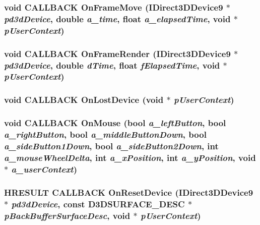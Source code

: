 \subsubsection[{OnFrameMove}]{\setlength{\rightskip}{0pt plus 5cm}void CALLBACK OnFrameMove (IDirect3DDevice9 $\ast$ {\em pd3dDevice}, \/  double {\em a\_\-time}, \/  float {\em a\_\-elapsedTime}, \/  void $\ast$ {\em pUserContext})}\label{main_8cpp_acfab206dcd4d453c6eb12c42b61a1e0d}
\subsubsection[{OnFrameRender}]{\setlength{\rightskip}{0pt plus 5cm}void CALLBACK OnFrameRender (IDirect3DDevice9 $\ast$ {\em pd3dDevice}, \/  double {\em dTime}, \/  float {\em fElapsedTime}, \/  void $\ast$ {\em pUserContext})}\label{main_8cpp_a4ea70c24b78c4abd92b442516fa054c3}
\subsubsection[{OnLostDevice}]{\setlength{\rightskip}{0pt plus 5cm}void CALLBACK OnLostDevice (void $\ast$ {\em pUserContext})}\label{main_8cpp_a8619e65167cef016a9b827796d09bd06}
\subsubsection[{OnMouse}]{\setlength{\rightskip}{0pt plus 5cm}void CALLBACK OnMouse (bool {\em a\_\-leftButton}, \/  bool {\em a\_\-rightButton}, \/  bool {\em a\_\-middleButtonDown}, \/  bool {\em a\_\-sideButton1Down}, \/  bool {\em a\_\-sideButton2Down}, \/  int {\em a\_\-mouseWheelDelta}, \/  int {\em a\_\-xPosition}, \/  int {\em a\_\-yPosition}, \/  void $\ast$ {\em a\_\-userContext})}\label{main_8cpp_a3ce2ae82f91e623da2ea0106afbf19d3}
\subsubsection[{OnResetDevice}]{\setlength{\rightskip}{0pt plus 5cm}HRESULT CALLBACK OnResetDevice (IDirect3DDevice9 $\ast$ {\em pd3dDevice}, \/  const D3DSURFACE\_\-DESC $\ast$ {\em pBackBufferSurfaceDesc}, \/  void $\ast$ {\em pUserContext})}\label{main_8cpp_a2130428fa858e2a86b28166e63f4374e}
